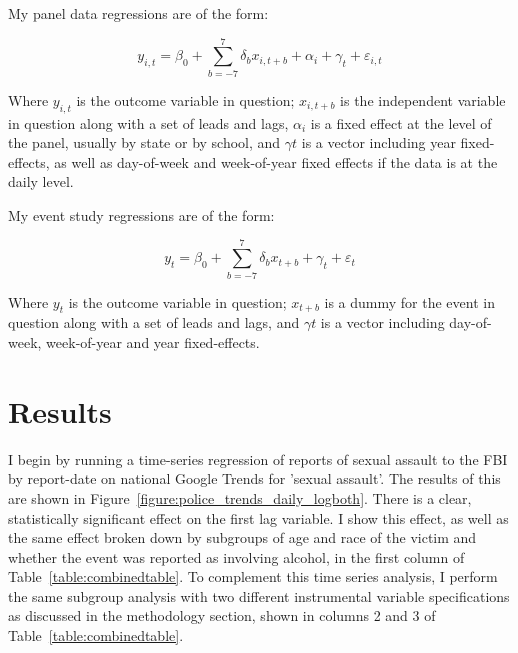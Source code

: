 \documentclass[AER,draftmode]{AEA}
\begin{document}

My panel data regressions are of the form: 

$$ 
y_{i,t} = \beta_{0} + \sum_{b=-7}^{7} \delta_{b} x_{i,t+b} + \alpha_{i} + \gamma_{t} + \varepsilon_{i,t}
$$

Where $y_{i,t}$ is the outcome variable in question; $x_{i,t+b}$ is the independent variable in question along with a set of leads and lags, $\alpha_{i}$ is a fixed effect at the level of the panel, usually by state or by school, and $\gamma{t}$ is a vector including year fixed-effects, as well as day-of-week and week-of-year fixed effects if the data is at the daily level.

My event study regressions are of the form: 

$$ 
y_{t} = \beta_{0} + \sum_{b=-7}^{7} \delta_{b} x_{t+b} + \gamma_{t} + \varepsilon_{t}
$$

Where $y_{t}$ is the outcome variable in question; $x_{t+b}$ is a dummy for the event in question along with a set of leads and lags, and $\gamma{t}$ is a vector including day-of-week, week-of-year and year fixed-effects.

\section{Results}

I begin by running a time-series regression of reports of sexual assault to the FBI by report-date on national Google Trends for 'sexual assault'. The results of this are shown in Figure~\ref{figure:police_trends_daily_logboth}. There is a clear, statistically significant effect on the first lag variable. I show this effect, as well as the same effect broken down by subgroups of age and race of the victim and whether the event was reported as involving alcohol, in the first column of Table~\ref{table:combinedtable}. To complement this time series analysis, I perform the same subgroup analysis with two different instrumental variable specifications as discussed in the methodology section, shown in columns 2 and 3 of Table~\ref{table:combinedtable}.
\end{document}
